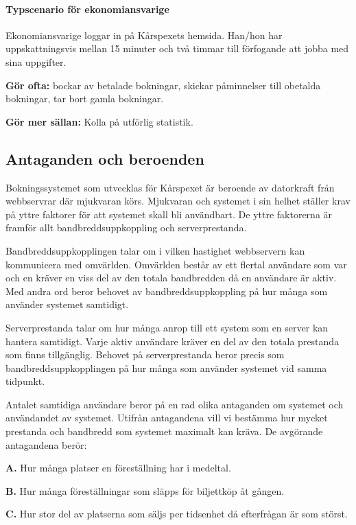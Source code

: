 \documentclass[a4paper, twoside, 11pt, titlepage]{article}
\begin{document}
			\paragraph{Typscenario för ekonomiansvarige}

			Ekonomiansvarige loggar in på Kårspexets hemsida. Han/hon har uppskattningsvis mellan 15 minuter och två timmar till förfogande att jobba med sina uppgifter.

			\textbf{Gör ofta:} bockar av betalade bokningar, skickar påminnelser till obetalda bokningar, tar bort gamla bokningar.

			\textbf{Gör mer sällan:} Kolla på utförlig statistik.

	\subsection{Antaganden och beroenden}


	Bokningssystemet som utvecklas för Kårspexet är beroende av datorkraft från webbservrar där mjukvaran körs. Mjukvaran och systemet i sin helhet ställer krav på yttre faktorer för att systemet skall bli användbart. De yttre faktorerna är framför allt bandbreddsuppkoppling och serverprestanda.

	Bandbreddsuppkopplingen talar om i vilken hastighet webbservern kan kommunicera med omvärlden. Omvärlden består av ett flertal användare som var och en kräver en viss del av den totala bandbredden då en användare är aktiv. Med andra ord beror behovet av bandbreddsuppkoppling på hur många som använder systemet samtidigt.

	Serverprestanda talar om hur många anrop till ett system som en server kan hantera samtidigt. Varje aktiv användare kräver en del av den totala prestanda som finns tillgänglig. Behovet på serverprestanda beror precis som bandbreddsuppkopplingen på hur många som använder systemet vid samma tidpunkt.

	Antalet samtidiga användare beror på en rad olika antaganden om systemet och användandet av systemet. Utifrån antagandena vill vi bestämma hur mycket prestanda och bandbredd som systemet maximalt kan kräva. De avgörande antagandena berör:

	\textbf{A.} Hur många platser en föreställning har i medeltal.

	\textbf{B.} Hur många föreställningar som släpps för biljettköp åt gången.

	\textbf{C.} Hur stor del av platserna som säljs per tidsenhet då efterfrågan är som störst.
\end{document}
